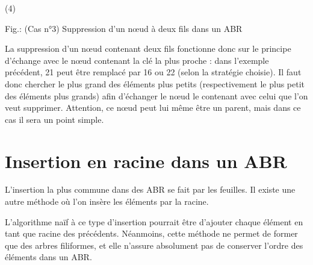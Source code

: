 \documentclass[11pt,a4paper]{article}
\begin{document}
\begin{table}[ht!]
\begin{minipage}{0.45\textwidth}
(4)

  \end{minipage}
\caption{Fig.\thefigure : (Cas n°3) Suppression d'un nœud à deux fils dans un ABR}
\label{fig:example4-BST-deletion-3-double-child}
\end{table}


La suppression d'un nœud contenant deux fils fonctionne donc sur le principe d'échange avec le nœud contenant la clé la plus proche : dans l'exemple précédent, 21 peut être remplacé par 16 ou 22 (selon la stratégie choisie).
Il faut donc chercher le plus grand des éléments plus petits (respectivement le plus petit des éléments plus grands) afin d'échanger le nœud le contenant avec celui que l'on veut supprimer.
Attention, ce nœud peut lui même être un parent, mais dans ce cas il sera un point simple.


\bigskip


\section{Insertion en racine dans un ABR}




%
L'insertion la plus commune dans des ABR se fait par les feuilles.
Il existe une autre méthode où l'on insère les éléments par la racine.

L'algorithme naïf à ce type d'insertion pourrait être d'ajouter chaque élément en tant que racine des précédents.
Néanmoins, cette méthode ne permet de former que des arbres filiformes, et elle n'assure absolument pas de conserver l'ordre des éléments dans un ABR.
\end{document}
